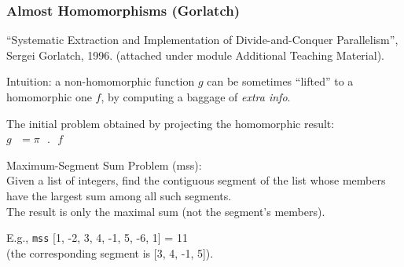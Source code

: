 \documentclass{beamer}
\renewcommand{\emph}[1]{\textcolor{structure}{#1}}
\newcommand{\emp}[1]{\textcolor{DikuRed}{ #1}}
\begin{document}
\begin{frame}[fragile,t]
  \frametitle{Almost Homomorphisms (Gorlatch)}

\emp{``Systematic Extraction and Implementation of Divide-and-Conquer Parallelism'', Sergei Gorlatch, 1996.} 
(attached under module Additional Teaching Material).
\bigskip

\emph{Intuition}: a non-homomorphic function $g$ can be sometimes ``lifted'' 
to a homomorphic one $f$, by computing a baggage of \emp{\em extra info}. 

\bigskip

The initial problem obtained by projecting the homomorphic result:\\
$g\mbox{ }=\pi\mbox{ }.\mbox{ }f$

\bigskip

\emp{Maximum-Segment Sum Problem ({\sc mss})}: \\
Given a list of integers, find the contiguous segment of the list 
whose members have the largest sum among all such segments.\\
The result is only the maximal sum (not the segment's members).

\bigskip

E.g., {\tt mss} [1, -2, 3, 4, -1, 5, -6, 1] = 11 \\
(the corresponding segment is [3, 4, -1, 5]). 

\end{frame}
\end{document}
